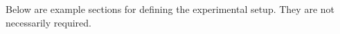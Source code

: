 \label{chap:experiments_setup}
Below are example sections for defining the experimental setup. They are not necessarily required.